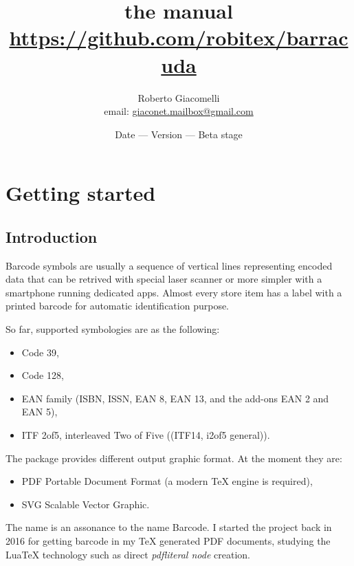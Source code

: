 \documentclass[11pt,a4paper]{article}
\author{Roberto Giacomelli\\\small email: \url{giaconet.mailbox@gmail.com}}
\title{the \code{barracuda} manual\\[1ex]
\small \url{https://github.com/robitex/barracuda}}
\date{\small Date \brcdkey{date} --- Version \brcdkey{version} --- Beta stage}
\begin{document}
\maketitle


\tableofcontents
\newpage


\section{Getting started}
\label{secStart}

\subsection{Introduction}
\label{secIntro}

Barcode symbols are usually a sequence of vertical lines representing encoded
data that can be retrived with special laser scanner or more simpler with a
smartphone running dedicated apps. Almost every store item has a label with a
printed barcode for automatic identification purpose.

So far, \brcd{} supported symbologies are as the following:
\begin{itemize}
\item Code 39,
\item Code 128,
\item EAN family (ISBN, ISSN, EAN 8, EAN 13, and the add-ons EAN 2 and EAN 5),
\item ITF 2of5, interleaved Two of Five ((ITF14, i2of5 general)).
\end{itemize}

The package provides different output graphic format. At the moment they are:
\begin{itemize}
\item PDF Portable Document Format (a modern \TeX{} engine is required),
\item SVG Scalable Vector Graphic.
\end{itemize}

The name \brcd{} is an assonance to the name Barcode. I started the project back
in 2016 for getting barcode in my \TeX{} generated PDF documents, studying the
Lua\TeX{} technology such as direct \emph{pdfliteral node} creation.
\end{document}

